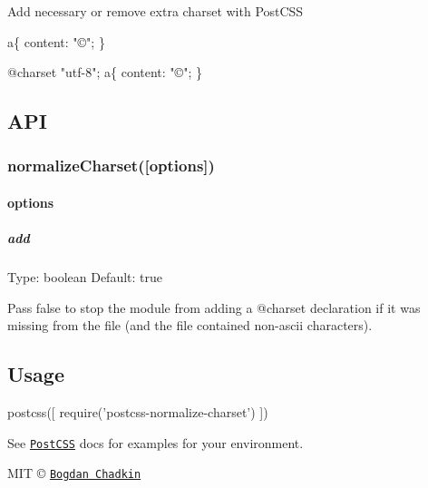 Add necessary or remove extra charset with Post\+C\+SS


\begin{DoxyCode}
a\{
  content: "©";
\}
\end{DoxyCode}



\begin{DoxyCode}
@charset "utf-8";
a\{
  content: "©";
\}
\end{DoxyCode}


\subsection*{A\+PI}

\subsubsection*{normalize\+Charset(\mbox{[}options\mbox{]})}

\paragraph*{options}

\subparagraph*{add}

Type\+: {\ttfamily boolean} Default\+: {\ttfamily true}

Pass {\ttfamily false} to stop the module from adding a {\ttfamily @charset} declaration if it was missing from the file (and the file contained non-\/ascii characters).

\subsection*{Usage}


\begin{DoxyCode}
postcss([ require('postcss-normalize-charset') ])
\end{DoxyCode}


See \href{https://github.com/postcss/postcss}{\tt Post\+C\+SS} docs for examples for your environment.

M\+IT © \href{mailto:trysound@yandex.ru}{\tt Bogdan Chadkin} 